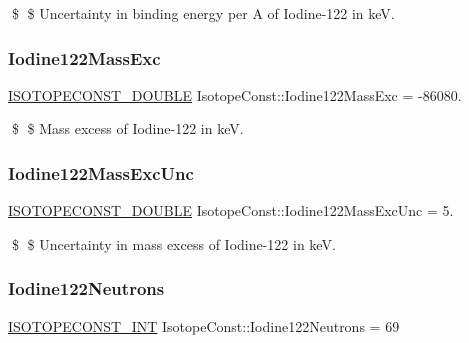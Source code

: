 \$ \$ Uncertainty in binding energy per A of Iodine-\/122 in keV. \mbox{\label{group___isotope_const-_iodine-_i122_gafec41c5dfe543f3d3d243b6f782679cf}} 
\subsubsection{\texorpdfstring{Iodine122\+Mass\+Exc}{Iodine122MassExc}}
{\footnotesize\ttfamily \mbox{\hyperlink{group___isotope_const-_macros_ga8f45a7272ce02c0b4c65c44636ed719a}{I\+S\+O\+T\+O\+P\+E\+C\+O\+N\+S\+T\+\_\+\+D\+O\+U\+B\+LE}} Isotope\+Const\+::\+Iodine122\+Mass\+Exc = -\/86080.}

\$ \$ Mass excess of Iodine-\/122 in keV. \mbox{\label{group___isotope_const-_iodine-_i122_ga84dcdb81bea926ca54c27ab0326a6333}} 
\subsubsection{\texorpdfstring{Iodine122\+Mass\+Exc\+Unc}{Iodine122MassExcUnc}}
{\footnotesize\ttfamily \mbox{\hyperlink{group___isotope_const-_macros_ga8f45a7272ce02c0b4c65c44636ed719a}{I\+S\+O\+T\+O\+P\+E\+C\+O\+N\+S\+T\+\_\+\+D\+O\+U\+B\+LE}} Isotope\+Const\+::\+Iodine122\+Mass\+Exc\+Unc = 5.}

\$ \$ Uncertainty in mass excess of Iodine-\/122 in keV. \mbox{\label{group___isotope_const-_iodine-_i122_ga962e8a863cadca3095e5179a16b478cb}} 
\subsubsection{\texorpdfstring{Iodine122\+Neutrons}{Iodine122Neutrons}}
{\footnotesize\ttfamily \mbox{\hyperlink{group___isotope_const-_macros_ga5f18360b3e99483a35c32d789e62621c}{I\+S\+O\+T\+O\+P\+E\+C\+O\+N\+S\+T\+\_\+\+I\+NT}} Isotope\+Const\+::\+Iodine122\+Neutrons = 69}

